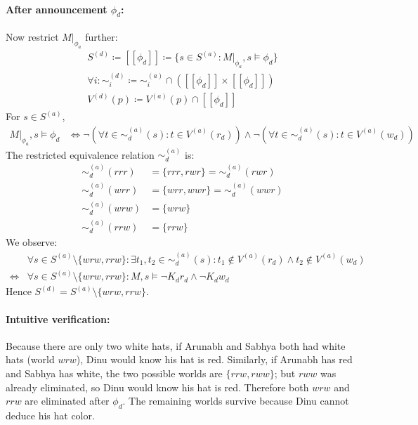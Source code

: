 \paragraph*{After announcement \(\phi_{d}\):} 
Now restrict \(M|_{\phi_{a}}\) further:
\begin{gather*}
    S^{(d)} \coloneqq [\![ \phi_{d} ]\!] \coloneqq 
        \{ s \in S^{(a)} : M|_{\phi_{a}},s \models \phi_{d}\} \\
    \forall i: \sim_{i}^{(d)} \coloneqq \sim_{i}^{(a)} \cap 
        ([\![ \phi_{d} ]\!] \times [\![ \phi_{d} ]\!]) \\
    V^{(d)}(p) \coloneqq V^{(a)}(p) \cap [\![ \phi_{d} ]\!]
\end{gather*}
For \(s \in S^{(a)}\),
\begin{align*}
    M|_{\phi_{a}},s \models \phi_{d} 
        &\iff \neg(\forall t \in \sim_{d}^{(a)}(s): t \in V^{(a)}(r_{d}))
            \land \neg(\forall t \in \sim_{d}^{(a)}(s): t \in V^{(a)}(w_{d})) 
                \tag{1.1(b4)}\label{eq:1.1(b4)}
\end{align*}
The restricted equivalence relation \(\sim_{d}^{(a)}\) is:
\begin{align*}
    \sim_{d}^{(a)}(rrr) &= \{ rrr,rwr \} = \sim_{d}^{(a)}(rwr) \\
    \sim_{d}^{(a)}(wrr) &= \{ wrr,wwr \} = \sim_{d}^{(a)}(wwr) \\
    \sim_{d}^{(a)}(wrw) &= \{ wrw \} \\
    \sim_{d}^{(a)}(rrw) &= \{ rrw \} \tag{1.1(b5)}\label{eq:1.1(b5)}
\end{align*}
We observe:
\begin{align*}
    &\forall s \in S^{(a)} \setminus \{wrw,rrw\}:
        \exists t_{1},t_{2} \in \sim^{(a)}_{d}(s):
            t_{1} \not\in V^{(a)}(r_{d}) \land t_{2} \not\in V^{(a)}(w_{d}) \\
    \iff &\forall s \in S^{(a)} \setminus \{wrw,rrw\}:
        M,s \models \neg K_{d}r_{d} \land \neg K_{d}w_{d} \tag{1.1(b6)}\label{eq:1.1(b6)}
\end{align*}
Hence \( S^{(d)} = S^{(a)} \setminus \{wrw, rrw\}\).

\paragraph{Intuitive verification:} Because there are only two white 
hats, if Arunabh and Sabhya both had white hats (world \(wrw\)), 
Dinu would know his hat is red. Similarly, if Arunabh has red and 
Sabhya has white, the two possible worlds are \(\{rrw, rww\}\); 
but \(rww\) was already eliminated, so Dinu would know his hat is red. 
Therefore both \(wrw\) and \(rrw\) are eliminated after \(\phi_{d}\). 
The remaining worlds survive because Dinu cannot deduce his hat color.

